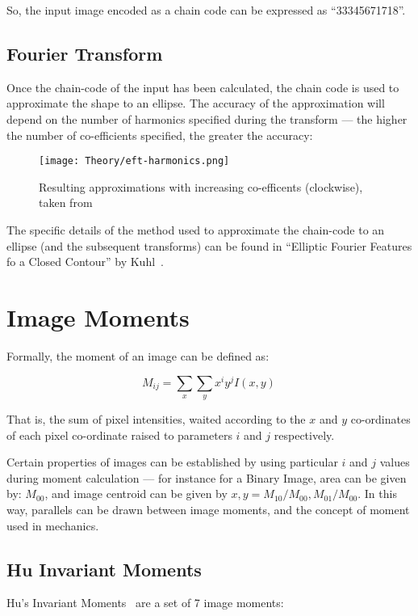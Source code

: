 So, the input image encoded as a chain code can be expressed as ``33345671718''. 

\subsection{Fourier Transform}
Once the chain-code of the input has been calculated, the chain code is used to approximate the shape to an ellipse. The accuracy of the approximation will depend on the number of harmonics specified during the transform --- the higher the number of co-efficients specified, the greater the accuracy:

\begin{figure}[H]
    \centering
    \texttt{[image: Theory/eft-harmonics.png]}
    \caption{Resulting approximations with increasing co-efficents (clockwise), taken from~\cite{kuhl1982elliptic}}
\end{figure}

The specific details of the method used to approximate the chain-code to an ellipse (and the subsequent transforms) can be found in ``Elliptic Fourier Features fo a Closed Contour'' by Kuhl~\cite{kuhl1982elliptic}.

\section{Image Moments}
Formally, the moment of an image can be defined as\cite{liao1996image}:

\begin{equation}
M_{ij} = \sum_x \sum_y x^i y^j I(x,y)\,\!
\end{equation}

That is, the sum of pixel intensities, waited according to the $x$ and $y$ co-ordinates of each pixel co-ordinate raised to parameters $i$ and $j$ respectively.

Certain properties of images can be established by using particular $i$ and $j$ values during moment calculation --- for instance for a Binary Image, area can be given by: $M_{00}$, and image centroid can be given by ${x, y} = M_{10}/M_{00}, M_{01}/M_{00}$. In this way, parallels can be drawn between image moments, and the concept of moment used in mechanics. 

\subsection{Hu Invariant Moments}
\label{sec:hu}
Hu's Invariant Moments~\cite{hu1962visual} are a set of 7 image moments:

